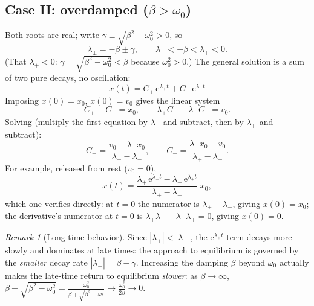 \documentclass[11pt]{article}
\theoremstyle{plain}
\theoremstyle{definition}
\theoremstyle{remark}
\newtheorem{remark}[lemma]{Remark}
\newcommand{\ee}{\mathrm{e}}
\begin{document}
\subsection{Case II: overdamped ($\beta > \omega_0$)}

Both roots are real; write $\gamma \equiv \sqrt{\beta^2-\omega_0^2} > 0$, so
\begin{equation}
  \lambda_\pm = -\beta \pm \gamma,
  \qquad
  \lambda_- < -\beta < \lambda_+ < 0 .
\end{equation}
(That $\lambda_+ <0$: $\gamma = \sqrt{\beta^2-\omega_0^2} < \beta$ because
$\omega_0^2>0$.) The general solution is a sum of two pure decays, no
oscillation:
\begin{equation}
  \boxed{\;
  x(t) = C_+\,\ee^{\lambda_+ t} + C_-\,\ee^{\lambda_- t}
  \;}
\end{equation}
Imposing $x(0)=x_0$, $\dot x(0)=v_0$ gives the linear system
\begin{equation}
  C_+ + C_- = x_0,
  \qquad
  \lambda_+ C_+ + \lambda_- C_- = v_0 .
\end{equation}
Solving (multiply the first equation by $\lambda_-$ and subtract, then by
$\lambda_+$ and subtract):
\begin{equation}
  C_+ = \frac{v_0 - \lambda_- x_0}{\lambda_+ - \lambda_-},
  \qquad
  C_- = \frac{\lambda_+ x_0 - v_0}{\lambda_+ - \lambda_-} .
\end{equation}
For example, released from rest ($v_0=0$),
\begin{equation}
  x(t) = \frac{\lambda_+\,\ee^{\lambda_- t} - \lambda_-\,\ee^{\lambda_+ t}}
              {\lambda_+ - \lambda_-}\; x_0 ,
\end{equation}
which one verifies directly: at $t=0$ the numerator is
$\lambda_+ - \lambda_-$, giving $x(0)=x_0$; the derivative's numerator at
$t=0$ is $\lambda_+\lambda_- - \lambda_-\lambda_+ = 0$, giving
$\dot x(0)=0$.

\begin{remark}[Long-time behavior]
Since $|\lambda_+| < |\lambda_-|$, the $\ee^{\lambda_+ t}$ term decays more
slowly and dominates at late times: the approach to equilibrium is governed by
the \emph{smaller} decay rate $|\lambda_+| = \beta - \gamma$. Increasing the
damping $\beta$ beyond $\omega_0$ actually makes the late-time return to
equilibrium \emph{slower}: as $\beta \to\infty$,
$\beta - \sqrt{\beta^2-\omega_0^2} = \frac{\omega_0^2}{\beta + \sqrt{\beta^2-\omega_0^2}} \to \frac{\omega_0^2}{2\beta} \to 0$.
\end{remark}
\end{document}
